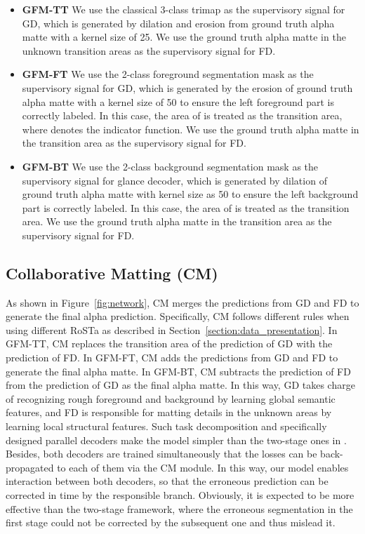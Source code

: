 \documentclass[twocolumn]{svjour3}
\begin{document}
\begin{itemize}
	\item \textbf{GFM-TT} We use the classical 3-class trimap  as the supervisory signal for GD, which is generated by dilation and erosion from ground truth alpha matte with a kernel size of 25. We use the ground truth alpha matte  in the unknown transition areas as the supervisory signal for FD.
	\item \textbf{GFM-FT} We use the 2-class foreground segmentation mask  as the supervisory signal for GD, which is generated by the erosion of ground truth alpha matte with a kernel size of 50 to ensure the left foreground part is correctly labeled. In this case, the area of  is treated as the transition area, where  denotes the indicator function. We use the ground truth alpha matte  in the transition area as the supervisory signal for FD.
	\item \textbf{GFM-BT} We use the 2-class background segmentation mask  as the supervisory signal for glance decoder, which is generated by dilation of ground truth alpha matte with kernel size as 50 to ensure the left background part is correctly labeled. In this case, the area of  is treated as the transition area. We use the ground truth alpha matte  in the transition area as the supervisory signal for FD.
\end{itemize}

\subsection{Collaborative Matting (CM)}
As shown in Figure~\ref{fig:network}, CM merges the predictions from GD and FD to generate the final alpha prediction. Specifically, CM follows different rules when using different RoSTa as described in Section~\ref{section:data_presentation}. In GFM-TT, CM replaces the transition area of the prediction of GD with the prediction of FD. In GFM-FT, CM adds the predictions from GD and FD to generate the final alpha matte. In GFM-BT, CM subtracts the prediction of FD from the prediction of GD as the final alpha matte. In this way, GD takes charge of recognizing rough foreground and background by learning global semantic features, and FD is responsible for matting details in the unknown areas by learning local structural features. Such task decomposition and specifically designed parallel decoders make the model simpler than the two-stage ones in \citep{chen2018semantic,zhang2019late}. Besides, both decoders are trained simultaneously that the losses can be back-propagated to each of them via the CM module. In this way, our model enables interaction between both decoders, so that the erroneous prediction can be corrected in time by the responsible branch. Obviously, it is expected to be more effective than the two-stage framework, where the erroneous segmentation in the first stage could not be corrected by the subsequent one and thus mislead it.
\end{document}
